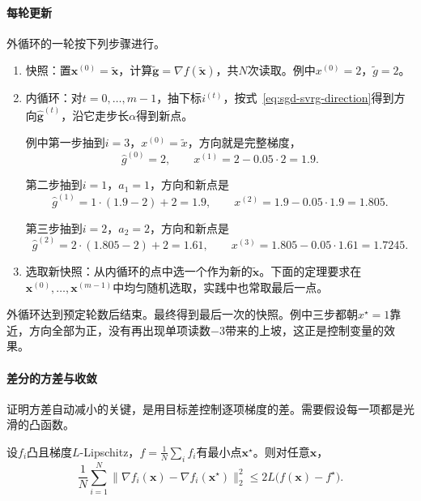 \paragraph{每轮更新}
外循环的一轮按下列步骤进行。

\begin{enumerate}
 \item 快照：置$\bm{x}^{(0)}=\tilde{\bm{x}}$，计算$\tilde{\bm{g}}=\nabla f(\tilde{\bm{x}})$，共$N$次读取。例中$x^{(0)}=2$，$\tilde{g}=2$。
 \item 内循环：对$t=0,\ldots,m-1$，抽下标$i^{(t)}$，按式~\eqref{eq:sgd-svrg-direction}得到方向$\hat{\bm{g}}^{(t)}$，沿它走步长$\alpha$得到新点。

 例中第一步抽到$i=3$，$x^{(0)}=\tilde{x}$，方向就是完整梯度，
 \[
  \hat{g}^{(0)}=2,\qquad x^{(1)}=2-0.05\cdot2=1.9.
 \]

 第二步抽到$i=1$，$a_1=1$，方向和新点是
 \[
  \hat{g}^{(1)}=1\cdot(1.9-2)+2=1.9,\qquad x^{(2)}=1.9-0.05\cdot1.9=1.805.
 \]

 第三步抽到$i=2$，$a_2=2$，方向和新点是
 \[
  \hat{g}^{(2)}=2\cdot(1.805-2)+2=1.61,\qquad x^{(3)}=1.805-0.05\cdot1.61=1.7245.
 \]
 \item 选取新快照：从内循环的点中选一个作为新的$\tilde{\bm{x}}$。下面的定理要求在$\bm{x}^{(0)},\ldots,\bm{x}^{(m-1)}$中均匀随机选取，实践中也常取最后一点。
\end{enumerate}

外循环达到预定轮数后结束。最终得到最后一次的快照。例中三步都朝$x^\star=1$靠近，方向全部为正，没有再出现单项读数$-3$带来的上坡，这正是控制变量的效果。

\paragraph{差分的方差与收敛}
证明方差自动减小的关键，是用目标差控制逐项梯度的差。需要假设每一项都是光滑的凸函数。

\begin{lemma}[逐项梯度差的控制]
\label{lem:sgd-gradient-difference}
设$f_i$凸且梯度$L$-Lipschitz，$f=\frac1N\sum_if_i$有最小点$\bm{x}^\star$。则对任意$\bm{x}$，
\begin{equation}
 \frac{1}{N}\sum_{i=1}^{N}\lVert\nabla f_i(\bm{x})-\nabla f_i(\bm{x}^\star)\rVert_2^2\leq2L\bigl(f(\bm{x})-f^\star\bigr).
 \label{eq:sgd-gradient-difference}
\end{equation}
\end{lemma}

